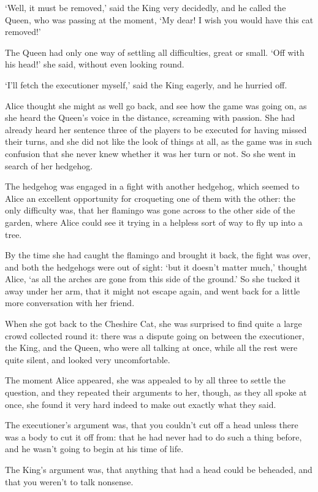 \documentclass[statementpaper,twoside,openany]{memoir}
\begin{document}
`Well, it must be removed,' said the King very decidedly, and he called the Queen, who was passing at the moment, `My dear! I wish you would have this cat removed!'

The Queen had only one way of settling all difficulties, great or small. `Off with his head!' she said, without even looking round.

`I'll fetch the executioner myself,' said the King eagerly, and he hurried off.

Alice thought she might as well go back, and see how the game was going on, as she heard the Queen's voice in the distance, screaming with passion. She had already heard her sentence three of the players to be executed for having missed their turns, and she did not like the look of things at all, as the game was in such confusion that she never knew whether it was her turn or not. So she went in search of her hedgehog.

The hedgehog was engaged in a fight with another hedgehog, which seemed to Alice an excellent opportunity for croqueting one of them with the other: the only difficulty was, that her flamingo was gone across to the other side of the garden, where Alice could see it trying in a helpless sort of way to fly up into a tree.

By the time she had caught the flamingo and brought it back, the fight was over, and both the hedgehogs were out of sight: `but it doesn't matter much,' thought Alice, `as all the arches are gone from this side of the ground.' So she tucked it away under her arm, that it might not escape again, and went back for a little more conversation with her friend.

When she got back to the Cheshire Cat, she was surprised to find quite a large crowd collected round it: there was a dispute going on between the executioner, the King, and the Queen, who were all talking at once, while all the rest were quite silent, and looked very uncomfortable.

The moment Alice appeared, she was appealed to by all three to settle the question, and they repeated their arguments to her, though, as they all spoke at once, she found it very hard indeed to make out exactly what they said.

The executioner's argument was, that you couldn't cut off a head unless there was a body to cut it off from: that he had never had to do such a thing before, and he wasn't going to begin at his time of life.

The King's argument was, that anything that had a head could be beheaded, and that you weren't to talk nonsense.
\end{document}
